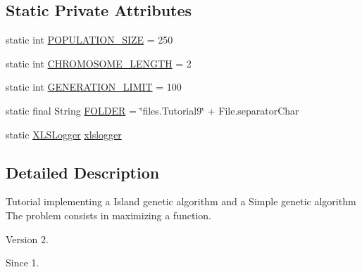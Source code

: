 \subsection*{Static Private Attributes}
\begin{DoxyCompactItemize}
\item 
static int \hyperlink{classjenes_1_1tutorials_1_1problem9_1_1_island_g_avs_simple_g_a_a7651a1c3812cced2ff7198299906f7d7}{P\-O\-P\-U\-L\-A\-T\-I\-O\-N\-\_\-\-S\-I\-Z\-E} = 250
\item 
static int \hyperlink{classjenes_1_1tutorials_1_1problem9_1_1_island_g_avs_simple_g_a_aadc2a6b04b46a9a5d957c3f22762f4d6}{C\-H\-R\-O\-M\-O\-S\-O\-M\-E\-\_\-\-L\-E\-N\-G\-T\-H} = 2
\item 
static int \hyperlink{classjenes_1_1tutorials_1_1problem9_1_1_island_g_avs_simple_g_a_ab3b13df96c99c89698c2c74340ae2c6d}{G\-E\-N\-E\-R\-A\-T\-I\-O\-N\-\_\-\-L\-I\-M\-I\-T} = 100
\item 
static final String \hyperlink{classjenes_1_1tutorials_1_1problem9_1_1_island_g_avs_simple_g_a_ab5429444736404c0a031ab65e28b8639}{F\-O\-L\-D\-E\-R} = \char`\"{}files.\-Tutorial9\char`\"{} + File.\-separator\-Char
\item 
static \hyperlink{classjenes_1_1utils_1_1_x_l_s_logger}{X\-L\-S\-Logger} \hyperlink{classjenes_1_1tutorials_1_1problem9_1_1_island_g_avs_simple_g_a_a47c83870d72507ba12efda584f0b1212}{xlslogger}
\end{DoxyCompactItemize}


\subsection{Detailed Description}
Tutorial implementing a Island genetic algorithm and a Simple genetic algorithm The problem consists in maximizing a function.

\begin{DoxyVersion}{Version}
2. 
\end{DoxyVersion}
\begin{DoxySince}{Since}
1. 
\end{DoxySince}


